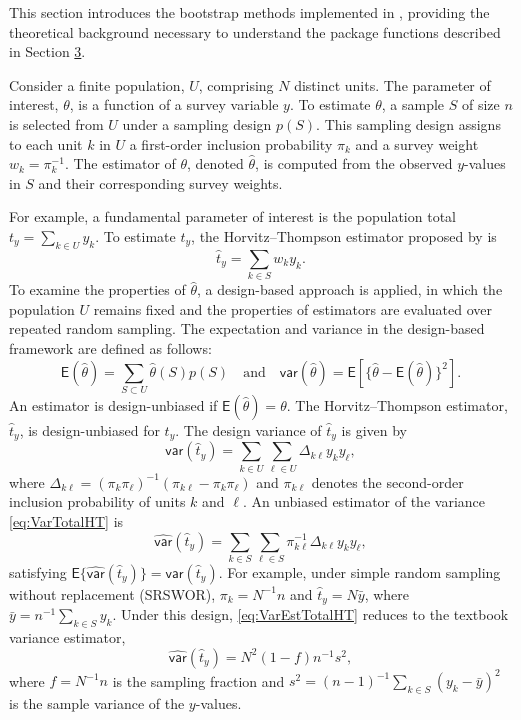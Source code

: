 This section introduces the bootstrap methods implemented in , providing the theoretical background necessary to understand the package functions described in Section \hyperref[sec:pkgbootsurv]{3}.

Consider a finite population, \(U\), comprising \(N\) distinct units. The parameter of interest, \(\theta\), is a function of a survey variable \(y\). To estimate \(\theta\), a sample \(\textrm{$S$}\) of size \(n\) is selected from \(U\) under a sampling design \(p(\textrm{$S$})\). This sampling design assigns to each unit \(k\) in \(U\) a first-order inclusion probability \(\pi_k\) and a survey weight \(w_k = \pi_k^{-1}\). The estimator of \(\theta\), denoted \(\hat\theta\), is computed from the observed \(y\)-values in \(\textrm{$S$}\) and their corresponding survey weights.

For example, a fundamental parameter of interest is the population total \(t_y = \sum_{k \in U} y_k\). To estimate \(t_y\), the Horvitz--Thompson estimator proposed by \citet{Horvitz:Thompson:1952} is
\[
    \hat t_y= \sum_{k \in \textrm{$S$}} w_k y_k.
\]
To examine the properties of \(\hat\theta\), a design-based approach is applied, in which the population \(U\) remains fixed and the properties of estimators are evaluated over repeated random sampling. The expectation and variance in the design-based framework are defined as follows:
\[
    \mathsf{E}(\hat\theta)= \sum_{\textrm{$S$}\subset U} \hat\theta (\textrm{$S$}) p(\textrm{$S$}) \quad \text{and} \quad \mathsf{var}(\hat\theta) = \mathsf{E}[\{\hat\theta-\mathsf{E}(\hat\theta)\}^2].
\]
An estimator is design-unbiased if \(\mathsf{E}(\hat \theta)= \theta\). The Horvitz--Thompson estimator, \(\hat t_y\), is design-unbiased for \(t_y\).
The design variance of \(\hat t_y\) is given by
\begin{equation}
    \mathsf{var}(\hat t_y) = \sum_{k \in U} \sum_{\textrm{$\ell$}\in U} \Delta_{k\textrm{$\ell$}} y_k y_\textrm{$\ell$}, 
      \label{eq:VarTotalHT}
\end{equation}
where \(\Delta_{k\textrm{$\ell$}} = (\pi_k \pi_\textrm{$\ell$})^{-1}(\pi_{k\textrm{$\ell$}}-\pi_k \pi_\textrm{$\ell$})\) and \(\pi_{k\textrm{$\ell$}}\) denotes the second-order inclusion probability of units \(k\) and \(\textrm{$\ell$}\). An unbiased estimator of the variance \eqref{eq:VarTotalHT} is
\begin{equation}
         \hat{\mathsf{var}}(\hat t_y) = \sum_{k \in \textrm{$S$}} \sum_{\textrm{$\ell$}\in \textrm{$S$}} \pi_{k\textrm{$\ell$}}^{-1} \Delta_{k\textrm{$\ell$}} y_k y_\textrm{$\ell$}, 
       \label{eq:VarEstTotalHT}
\end{equation}
satisfying \(\mathsf{E}\{\hat{\mathsf{var}}(\hat t_y)\}=\mathsf{var}(\hat t_y)\).
For example, under simple random sampling without replacement (SRSWOR), \(\pi_k=N^{-1}n\) and \(\hat t_y= N\bar y\), where \(\bar y=n^{-1} \sum_{k \in \textrm{$S$}} y_k\). Under this design, \eqref{eq:VarEstTotalHT} reduces to the textbook variance estimator,
\[
    \hat{\mathsf{var}}(\hat t_y) = N^2 (1-f) n^{-1} s^2,
\]
where \(f=N^{-1}n\) is the sampling fraction and \(s^2=(n-1)^{-1}\sum_{k \in \textrm{$S$}} (y_k-\bar y)^2\) is the sample variance of the \(y\)-values.

